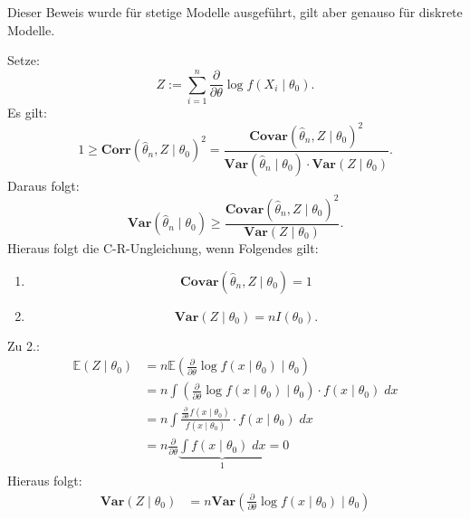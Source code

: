 \documentclass[10pt]{article}
\newcommand{\EW}{\mathbb{E}} %
\newcommand{\ablt}{\frac{\partial}{\partial \theta}}
\newenvironment{BWS}[1][]
{\begin{Beweis}[frametitle=#1]}{\end{Beweis}}
\begin{document}
	\begin{BWS}[Beweis 1.4.1 (Effizienz)]
		Dieser Beweis wurde für stetige Modelle ausgeführt, gilt aber genauso für diskrete Modelle.
		
		Setze:
		\begin{equation*}
			Z := \sum_{i=1}^{n} \frac{\partial}{\partial \theta} \log f(X_i \mid \theta_0).
		\end{equation*}
		Es gilt:
		\begin{equation*}
			1 \geq \textbf{Corr}(\hat{\theta}_n, Z \mid \theta_0)^2 = \frac{\textbf{Covar}(\hat{\theta}_n, Z \mid \theta_0)^2}{\textbf{Var}(\hat{\theta}_n \mid \theta_0) \cdot \textbf{Var}(Z \mid \theta_0)}.
		\end{equation*}
		Daraus folgt:
		\begin{equation*}
			\textbf{Var}(\hat{\theta}_n \mid \theta_0) \geq \frac{\textbf{Covar}(\hat{\theta}_n, Z \mid \theta_0)^2}{\textbf{Var}(Z \mid \theta_0)}.
		\end{equation*}
		Hieraus folgt die C-R-Ungleichung, wenn Folgendes gilt:
		\begin{enumerate}
			\item 
			\begin{equation*}
				\textbf{Covar}(\hat{\theta}_n, Z \mid \theta_0) = 1
			\end{equation*}
			\item 
			\begin{equation*}
				\textbf{Var}(Z\mid \theta_0) = nI(\theta_0).
			\end{equation*}
		\end{enumerate}
		Zu 2.:
		\begin{equation*}
			\begin{split}
				\EW (Z \mid \theta_0) &=  n\EW\left(\ablt \log f(x \mid \theta_0)\mid \theta_0\right)\\
				&= n \int \left(\ablt \log f(x \mid \theta_0)\mid \theta_0\right) \cdot f(x \mid \theta_0) \; dx\\
				&= n \int \frac{\ablt f(x \mid \theta_0)}{f(x \mid \theta_0)} \cdot f(x \mid \theta_0) \; dx\\
				&= n \ablt \underbrace{\int f(x \mid \theta_0) \; dx}_{1} = 0
			\end{split}
		\end{equation*}
		Hieraus folgt:
		\begin{equation*}
			\begin{split}
				\textbf{Var}(Z \mid \theta_0) &= n \textbf{Var}\left(\ablt \log f(x \mid \theta_0)\mid \theta_0 \right)\\

\end{split}
\end{equation*}
\end{BWS}
\end{document}
